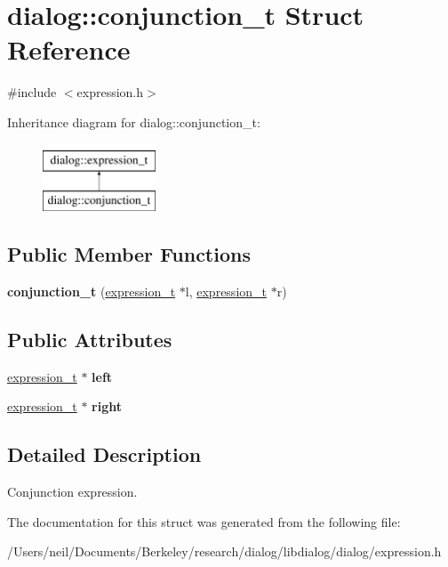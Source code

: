 \hypertarget{structdialog_1_1conjunction__t}{}\section{dialog\+:\+:conjunction\+\_\+t Struct Reference}
\label{structdialog_1_1conjunction__t}


{\ttfamily \#include $<$expression.\+h$>$}

Inheritance diagram for dialog\+:\+:conjunction\+\_\+t\+:\begin{figure}[H]
\begin{center}
\leavevmode
\includegraphics[height=2.000000cm]{structdialog_1_1conjunction__t}
\end{center}
\end{figure}
\subsection*{Public Member Functions}
\begin{DoxyCompactItemize}
\item 
\mbox{\label{structdialog_1_1conjunction__t_a6b209e62505e025419b9295d28de0fa3}} 
{\bfseries conjunction\+\_\+t} (\hyperlink{structdialog_1_1expression__t}{expression\+\_\+t} $\ast$l, \hyperlink{structdialog_1_1expression__t}{expression\+\_\+t} $\ast$r)
\end{DoxyCompactItemize}
\subsection*{Public Attributes}
\begin{DoxyCompactItemize}
\item 
\mbox{\label{structdialog_1_1conjunction__t_a85ed51a16983ebca8c8d757ee61c9d47}} 
\hyperlink{structdialog_1_1expression__t}{expression\+\_\+t} $\ast$ {\bfseries left}
\item 
\mbox{\label{structdialog_1_1conjunction__t_a7ff66bb8e0bcae1c21ed0a241a66db6d}} 
\hyperlink{structdialog_1_1expression__t}{expression\+\_\+t} $\ast$ {\bfseries right}
\end{DoxyCompactItemize}


\subsection{Detailed Description}
Conjunction expression. 

The documentation for this struct was generated from the following file\+:\begin{DoxyCompactItemize}
\item 
/\+Users/neil/\+Documents/\+Berkeley/research/dialog/libdialog/dialog/expression.\+h\end{DoxyCompactItemize}
